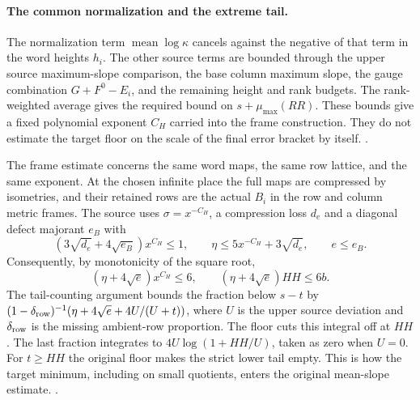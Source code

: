 \paragraph{The common normalization and the extreme tail.}
The normalization term \(\operatorname{mean}\log\kappa\) cancels
against the negative of that term in the word heights \(h_i\).
The other source terms are bounded through the upper source
maximum-slope comparison, the base column maximum slope, the gauge
combination \(G+F^0-E_i\), and the remaining height and rank budgets.
The rank-weighted average gives the required bound on \(s+\mu_{\max}(RR)\).
These bounds give a fixed polynomial exponent \(C_H\) carried into
the frame construction. They do not estimate the target floor on
the scale of the final error bracket by itself.
.

The frame estimate concerns the same word maps, the same row
lattice, and the same exponent. At the chosen infinite place the
full maps are compressed by isometries, and their retained rows
are the actual \(B_i\) in the row and column metric frames. The
source uses \(\sigma=x^{-C_H}\), a compression loss \(d_e\) and a
diagonal defect majorant \(e_B\) with
\[
 (3\sqrt{d_e}+4\sqrt{e_B})x^{C_H}\le1,\qquad
 \eta\le 5x^{-C_H}+3\sqrt{d_e},\qquad e\le e_B .
\]
Consequently, by monotonicity of the square root,
\[
       (\eta+4\sqrt e)x^{C_H}\le6,\qquad
       (\eta+4\sqrt e)HH\le6b .
\]
The tail-counting argument bounds the fraction below \(s-t\) by
\((1-\delta_{\rm row})^{-1}(\eta+4\sqrt e+4U/(U+t))\), where \(U\)
is the upper source deviation and \(\delta_{\rm row}\) is the
missing ambient-row proportion. The floor cuts this integral off
at \(HH\). The last fraction integrates to
\(4U\log(1+HH/U)\), taken as zero when \(U=0\). For \(t\ge HH\)
the original floor makes the strict lower tail empty. This is how
the target minimum, including on small quotients, enters the
original mean-slope estimate.
.


